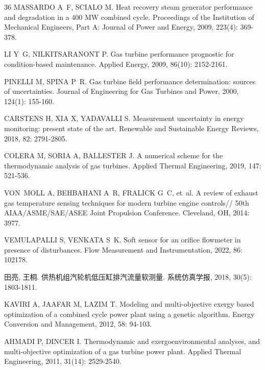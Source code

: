 \begin{thebibliography}{36}
MASSARDO A~F, SCIALO M.
\newblock Heat recovery steam generator performance and degradation in a 400 MW
  combined cycle\allowbreak[J].
\newblock Proceedings of the Institution of Mechanical Engineers, Part A:
  Journal of Power and Energy, 2009, 223\allowbreak (4): 369-378.

LI Y~G, NILKITSARANONT P.
\newblock Gas turbine performance prognostic for condition-based
  maintenance\allowbreak[J].
\newblock Applied Energy, 2009, 86\allowbreak (10): 2152-2161.

PINELLI M, SPINA P~R.
\newblock Gas turbine field performance determination: sources of
  uncertainties\allowbreak[J].
\newblock Journal of Engineering for Gas Turbines and Power, 2000,
  124\allowbreak (1): 155-160.

CARSTENS H, XIA X, YADAVALLI S.
\newblock Measurement uncertainty in energy monitoring: present state of the
  art\allowbreak[J].
\newblock Renewable and Sustainable Energy Reviews, 2018, 82: 2791-2805.

COLERA M, SORIA A, BALLESTER J.
\newblock A numerical scheme for the thermodynamic analysis of gas
  turbines\allowbreak[J].
\newblock Applied Thermal Engineering, 2019, 147: 521-536.

VON~MOLL A, BEHBAHANI A~R, FRALICK G~C, et~al.
\newblock A review of exhaust gas temperature sensing techniques for modern
  turbine engine controls\allowbreak[C]//\allowbreak
50th AIAA/ASME/SAE/ASEE Joint Propulsion Conference.
\newblock Cleveland, OH, 2014: 3977.

VEMULAPALLI S, VENKATA S~K.
\newblock Soft sensor for an orifice flowmeter in presence of
  disturbances\allowbreak[J].
\newblock Flow Measurement and Instrumentation, 2022, 86: 102178.

田亮, 王桐.
\newblock 供热机组汽轮机低压缸排汽流量软测量\allowbreak[J].
\newblock 系统仿真学报, 2018, 30\allowbreak (5): 1803-1811.

KAVIRI A, JAAFAR M, LAZIM T.
\newblock Modeling and multi-objective exergy based optimization of a combined
  cycle power plant using a genetic algorithm\allowbreak[J].
\newblock Energy Conversion and Management, 2012, 58: 94-103.

AHMADI P, DINCER I.
\newblock Thermodynamic and exergoenvironmental analyses, and multi-objective
  optimization of a gas turbine power plant\allowbreak[J].
\newblock Applied Thermal Engineering, 2011, 31\allowbreak (14): 2529-2540.

\end{thebibliography}
